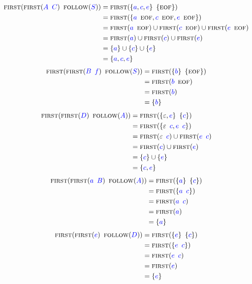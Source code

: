 \documentclass{article}
\newcommand{\FIRST}{\textsc{first}}
\newcommand{\FOLLOW}{\textsc{follow}}
\newcommand{\EOF}{\textsc{eof}}
\newcommand{\Symbol}[1]{\textcolor{blue}{#1}}
\newcommand{\Null}{\varepsilon}
\newcommand{\Seq}{{\ \,}}
\begin{document}
\begin{align*}
  \FIRST(\FIRST(\Symbol{A} \Seq \Symbol{C}) \Seq \FOLLOW(\Symbol{S})) &= \FIRST(\{\Symbol{a}, \Symbol{c}, \Symbol{e}\} \Seq \{\EOF\})\\
  &= \FIRST(\{\Symbol{a} \Seq \EOF, \Symbol{c} \Seq \EOF, \Symbol{e} \Seq \EOF\})\\
  &= \FIRST(\Symbol{a} \Seq \EOF) \cup \FIRST(\Symbol{c} \Seq \EOF) \cup \FIRST(\Symbol{e} \Seq \EOF)\\
  &= \FIRST(\Symbol{a}) \cup \FIRST(\Symbol{c}) \cup \FIRST(\Symbol{e})\\
  &= \{\Symbol{a}\} \cup \{\Symbol{c}\} \cup \{\Symbol{e}\}\\
  &= \{\Symbol{a}, \Symbol{c}, \Symbol{e}\}
\end{align*}
\begin{align*}
  \FIRST(\FIRST(\Symbol{B} \Seq \Symbol{f}) \Seq \FOLLOW(\Symbol{S})) &= \FIRST(\{\Symbol{b}\} \Seq \{\EOF\})\\
  &= \FIRST(\Symbol{b} \Seq \EOF)\\
  &= \FIRST(\Symbol{b}) \\ 
  &= \{\Symbol{b}\} 
\end{align*}
\begin{align*}
  \FIRST(\FIRST(\Symbol{D}) \Seq \FOLLOW(\Symbol{A})) &= \FIRST(\{\Null, \Symbol{e}\} \Seq \{\Symbol{c}\})\\
  &= \FIRST(\{\Null \Seq \Symbol{c}, \Symbol{e} \Seq \Symbol{c}\})\\
  &= \FIRST(\Null \Seq \Symbol{c}) \cup \FIRST(\Symbol{e} \Seq \Symbol{c})\\
  &= \FIRST(\Symbol{c}) \cup \FIRST(\Symbol{e})\\
  &= \{\Symbol{c}\} \cup \{\Symbol{e}\}\\
  &= \{\Symbol{c}, \Symbol{e}\}
\end{align*}
\begin{align*}
  \FIRST(\FIRST(\Symbol{a} \Seq \Symbol{B}) \Seq \FOLLOW(\Symbol{A})) &= \FIRST(\{\Symbol{a}\} \Seq \{\Symbol{c}\})\\
  &= \FIRST(\{\Symbol{a} \Seq \Symbol{c}\})\\
  &= \FIRST(\Symbol{a} \Seq \Symbol{c})\\ 
  &= \FIRST(\Symbol{a})\\
  &= \{\Symbol{a}\}
\end{align*}
\begin{align*}
  \FIRST(\FIRST(\Symbol{e}) \Seq \FOLLOW(\Symbol{D})) &= \FIRST(\{\Symbol{e}\} \Seq \{\Symbol{c}\})\\
  &= \FIRST(\{\Symbol{e} \Seq \Symbol{c}\})\\
  &= \FIRST(\Symbol{e} \Seq \Symbol{c})\\ 
  &= \FIRST(\Symbol{e})\\
  &= \{\Symbol{e}\}
\end{align*}
\end{document}
